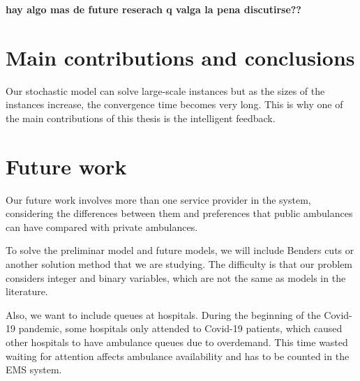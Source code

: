  \textbf{hay algo mas de future reserach q valga la pena discutirse??}

\section{Main contributions and conclusions}

Our stochastic model can solve large-scale instances but as the sizes of the instances increase, the convergence time becomes very long. This is why one of the main contributions of this thesis is the intelligent feedback.




\section{Future work}

Our future work involves more than one service provider in the system, considering the differences between them and preferences that public ambulances can have compared with private ambulances. 

To solve the preliminar model and future models, we will include Benders cuts or another solution method that we are studying. The difficulty is that our problem considers integer and binary variables, which are not the same as models in the literature.

Also, we want to include queues at hospitals. During the beginning of the Covid-19 pandemic, some hospitals only attended to Covid-19 patients, which caused other hospitals to have ambulance queues due to overdemand. This time wasted waiting for attention affects ambulance availability and has to be counted in the EMS system. 